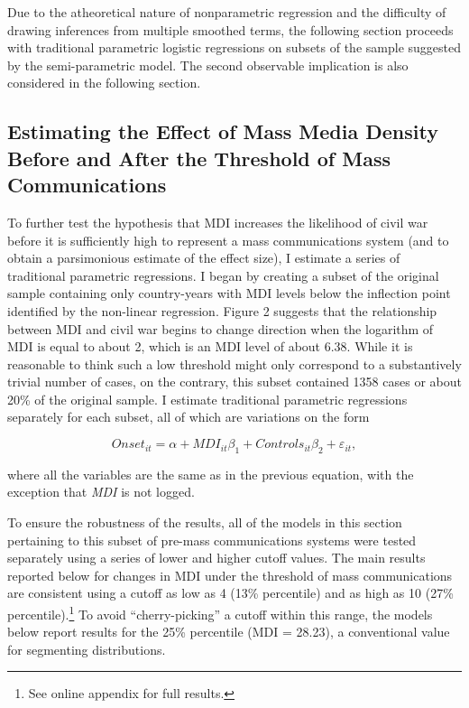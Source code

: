 \documentclass[11pt,article,oneside]{memoir}
\begin{document}
Due to the atheoretical nature of nonparametric regression and the
difficulty of drawing inferences from multiple smoothed terms, the
following section proceeds with traditional parametric logistic
regressions on subsets of the sample suggested by the semi-parametric
model. The second observable implication is also considered in the
following section.

\subsection{Estimating the Effect of Mass Media Density Before and After
the Threshold of Mass
Communications}\label{estimating-the-effect-of-mass-media-density-before-and-after-the-threshold-of-mass-communications}

To further test the hypothesis that MDI increases the likelihood of
civil war before it is sufficiently high to represent a mass
communications system (and to obtain a parsimonious estimate of the
effect size), I estimate a series of traditional parametric regressions.
I began by creating a subset of the original sample containing only
country-years with MDI levels below the inflection point identified by
the non-linear regression. Figure 2 suggests that the relationship
between MDI and civil war begins to change direction when the logarithm
of MDI is equal to about 2, which is an MDI level of about 6.38. While
it is reasonable to think such a low threshold might only correspond to
a substantively trivial number of cases, on the contrary, this subset
contained 1358 cases or about 20\% of the original sample. I estimate
traditional parametric regressions separately for each subset, all of
which are variations on the form

\[ Onset_{it} = \alpha + MDI_{it} \beta_1 + Controls_{it} \beta_2  + \varepsilon_{it}, \]

where all the variables are the same as in the previous equation, with
the exception that \emph{MDI} is not logged.

To ensure the robustness of the results, all of the models in this
section pertaining to this subset of pre-mass communications systems
were tested separately using a series of lower and higher cutoff values.
The main results reported below for changes in MDI under the threshold
of mass communications are consistent using a cutoff as low as 4 (13\%
percentile) and as high as 10 (27\% percentile).\footnote{See online
  appendix for full results.} To avoid ``cherry-picking'' a cutoff
within this range, the models below report results for the 25\%
percentile (MDI = 28.23), a conventional value for segmenting
distributions.
\end{document}

